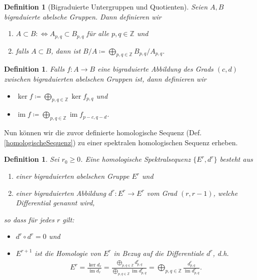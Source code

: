 \documentclass[12pt, hidelinks]{article}
\numberwithin{conj}{section}
\newtheorem{definition}[conj]{Definition}
\newcommand{\Z}{\mathbb{Z}}
\newcommand{\ima}{\operatorname{im}}
\begin{document}
\begin{definition}[Bigraduierte Untergruppen und Quotienten]
    Seien $A,B$ bigraduierte abelsche Gruppen. Dann definieren wir
    \begin{enumerate}[nolistsep]
        \item $A \subset B \colon\Leftrightarrow A_{p,q} \subset B_{p,q}$ für alle $p,q \in \Z$ und
        \item falls $A \subset B$, dann ist $B/A \coloneq \bigoplus_{p,q \in \Z} B_{p,q}/A_{p,q}$.
    \end{enumerate}
\end{definition}

\begin{definition}
    Falls $f: A \to B$ eine bigraduierte Abbildung des Grads $(c,d)$ zwischen bigraduierten abelschen Gruppen ist, dann definieren wir
    \begin{itemize}[nolistsep]
        \item $\ker f \coloneq \bigoplus_{p,q \in \Z} \ker f_{p,q}$ und
        \item $\ima f \coloneq \bigoplus_{p,q \in \Z} \ima f_{p-c,q-d}$.
    \end{itemize}
\end{definition}

Nun können wir die zuvor definierte homologische Sequenz (Def. \ref{homologischeSequenz}) zu einer spektralen homologischen Sequenz erheben.

\begin{definition}
    \label{homologischeSpektraleSequenz}
    Sei $r_0 \geq 0$. Eine homologische Spektralsequenz $\{E^r,d^r\}$ besteht aus
    \begin{enumerate}[nolistsep]
        \item einer bigraduierten abelschen Gruppe $E^r$ und
        \item einer bigraduierten Abbildung $d^r: E^r \to E^r$ vom Grad $(r,r-1)$, welche Differential genannt wird,
    \end{enumerate}
    so dass für jedes $r$ gilt:
    \begin{itemize}[nolistsep]
        \item $d^r \circ d^r = 0$ und
        \item $E^{r+1}$ ist die Homologie von $E^r$ in Bezug auf die Differentiale $d^r$, d.h.
        \begin{align}
            E^r = \frac{\ker d_r}{\ima d_r} = \frac{\bigoplus_{p,q \in \Z} d^r_{p,q}}{\bigoplus_{p,q \in \Z} \ima d^r_{p,q}} = \bigoplus_{p,q \in \Z} \frac{d^r_{p,q}}{\ima d^r_{p,q}}.
        \end{align}
    \end{itemize}
\end{definition}
\end{document}
